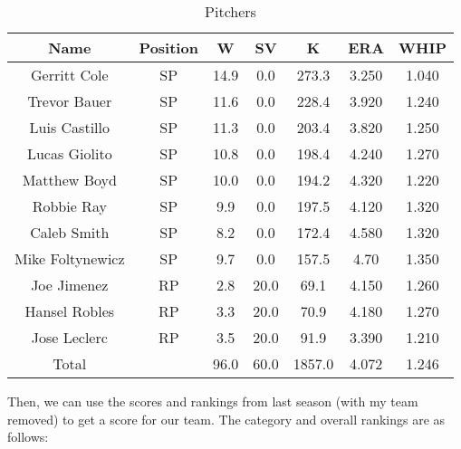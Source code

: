 \documentclass{article}
\begin{document}
\begin{table}[ht] \caption{Pitchers}
\centering
\begin{tabular}{c c c c c c c}
\hline\hline
Name & Position & W & SV & K & ERA & WHIP \\
\hline
Gerritt Cole & SP & 14.9 & 0.0 & 273.3 & 3.250 & 1.040 \\
Trevor Bauer & SP & 11.6 & 0.0 & 228.4 & 3.920 & 1.240 \\
Luis Castillo & SP & 11.3 & 0.0 & 203.4 & 3.820 & 1.250 \\
Lucas Giolito & SP & 10.8 & 0.0 & 198.4 & 4.240 & 1.270 \\
Matthew Boyd & SP & 10.0 & 0.0 & 194.2 & 4.320 & 1.220 \\
Robbie Ray & SP & 9.9 & 0.0 & 197.5 & 4.120 & 1.320 \\
Caleb Smith & SP & 8.2 & 0.0 & 172.4 & 4.580 & 1.320 \\
Mike Foltynewicz & SP & 9.7 & 0.0 & 157.5 & 4.70 & 1.350 \\
Joe Jimenez & RP & 2.8 & 20.0 & 69.1 & 4.150 & 1.260  \\
Hansel Robles & RP & 3.3 & 20.0 & 70.9 & 4.180 & 1.270 \\
Jose Leclerc & RP & 3.5 & 20.0 & 91.9 & 3.390 & 1.210 \\
\hline
Total & & 96.0 & 60.0 & 1857.0 & 4.072 & 1.246 \\
\hline
\end{tabular}
\end{table}
\newpage
\noindent Then, we can use the scores and rankings from last season (with my team removed) to get a score for our team. The category and overall rankings are as follows:
\end{document}
